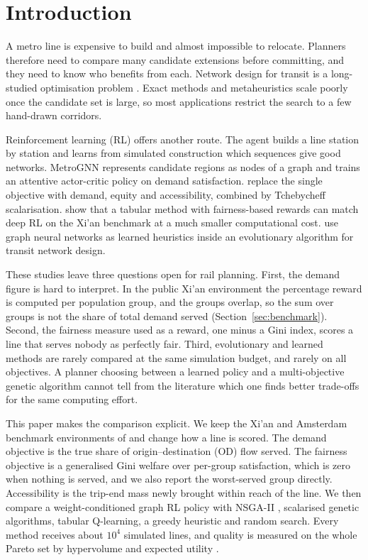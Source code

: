 \section{Introduction}\label{sec:intro}

A metro line is expensive to build and almost impossible to relocate. Planners therefore need to compare many candidate extensions before committing, and they need to know who benefits from each. Network design for transit is a long-studied optimisation problem \citep{guihaire2008,farahani2013}. Exact methods and metaheuristics scale poorly once the candidate set is large, so most applications restrict the search to a few hand-drawn corridors.

Reinforcement learning (RL) offers another route. The agent builds a line station by station and learns from simulated construction which sequences give good networks. MetroGNN \citep{su2024} represents candidate regions as nodes of a graph and trains an attentive actor-critic policy on demand satisfaction. \citet{zhang2024} replace the single objective with demand, equity and accessibility, combined by Tchebycheff scalarisation. \citet{michailidis2026} show that a tabular method with fairness-based rewards can match deep RL on the Xi'an benchmark at a much smaller computational cost. \citet{holliday2025} use graph neural networks as learned heuristics inside an evolutionary algorithm for transit network design.

These studies leave three questions open for rail planning. First, the demand figure is hard to interpret. In the public Xi'an environment the percentage reward is computed per population group, and the groups overlap, so the sum over groups is not the share of total demand served (Section~\ref{sec:benchmark}). Second, the fairness measure used as a reward, one minus a Gini index, scores a line that serves nobody as perfectly fair. Third, evolutionary and learned methods are rarely compared at the same simulation budget, and rarely on all objectives. A planner choosing between a learned policy and a multi-objective genetic algorithm cannot tell from the literature which one finds better trade-offs for the same computing effort.

This paper makes the comparison explicit. We keep the Xi'an and Amsterdam benchmark environments of \citet{michailidis2026} and change how a line is scored. The demand objective is the true share of origin--destination (OD) flow served. The fairness objective is a generalised Gini welfare \citep{weymark1981} over per-group satisfaction, which is zero when nothing is served, and we also report the worst-served group directly. Accessibility is the trip-end mass newly brought within reach of the line. We then compare a weight-conditioned graph RL policy with NSGA-II \citep{deb2002}, scalarised genetic algorithms, tabular Q-learning, a greedy heuristic and random search. Every method receives about $10^4$ simulated lines, and quality is measured on the whole Pareto set by hypervolume and expected utility \citep{zitzler2003,hayes2022}.

